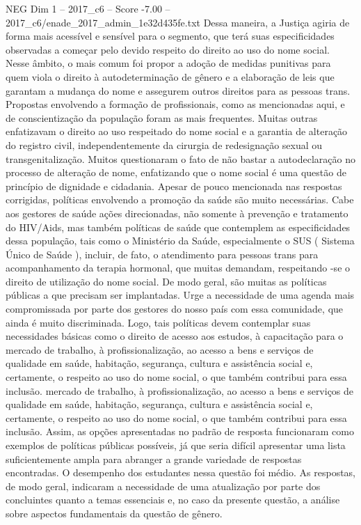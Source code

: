 \begin{textsample}{NEG Dim 1 – 2017\_c6 – Score -7.00 – 2017\_c6/enade\_2017\_admin\_1e32d435fe.txt}
Dessa maneira, a Justiça agiria de forma mais acessível e sensível para o segmento, que terá suas especificidades observadas a começar pelo devido respeito do direito ao uso do nome social.
Nesse âmbito, o mais comum foi propor a adoção de medidas punitivas para quem viola o direito à autodeterminação de gênero e a elaboração de leis que garantam a mudança do nome e assegurem outros direitos para as pessoas trans.
Propostas envolvendo a formação de profissionais, como as mencionadas aqui, e de conscientização da população foram as mais frequentes.
Muitas outras enfatizavam o direito ao uso respeitado do nome social e a garantia de alteração do registro civil, independentemente da cirurgia de redesignação sexual ou transgenitalização.
Muitos questionaram o fato de não bastar a autodeclaração no processo de alteração de nome, enfatizando que o nome social é uma questão de princípio de dignidade e cidadania.
Apesar de pouco mencionada nas respostas corrigidas, políticas envolvendo a promoção da saúde são muito necessárias.
Cabe aos gestores de saúde ações direcionadas, não somente à prevenção e tratamento do HIV/Aids, mas também políticas de saúde que contemplem as especificidades dessa população, tais como o Ministério da Saúde, especialmente o SUS ( Sistema Único de Saúde ), incluir, de fato, o atendimento para pessoas trans para acompanhamento da terapia hormonal, que muitas demandam, respeitando -se o direito de utilização do nome social.
De modo geral, são muitas as políticas públicas a que precisam ser implantadas.
Urge a necessidade de uma agenda mais compromissada por parte dos gestores do nosso país com essa comunidade, que ainda é muito discriminada.
Logo, tais políticas devem contemplar suas necessidades básicas como o direito de acesso aos estudos, à capacitação para o mercado de trabalho, à profissionalização, ao acesso a bens e serviços de qualidade em saúde, habitação, segurança, cultura e assistência social e, certamente, o respeito ao uso do nome social, o que também contribui para essa inclusão. mercado de trabalho, à profissionalização, ao acesso a bens e serviços de qualidade em saúde, habitação, segurança, cultura e assistência social e, certamente, o respeito ao uso do nome social, o que também contribui para essa inclusão.
Assim, as opções apresentadas no padrão de resposta funcionaram como exemplos de políticas públicas possíveis, já que seria difícil apresentar uma lista suficientemente ampla para abranger a grande variedade de respostas encontradas.
O desempenho dos estudantes nessa questão foi médio.
As respostas, de modo geral, indicaram a necessidade de uma atualização por parte dos concluintes quanto a temas essenciais e, no caso da presente questão, a análise sobre aspectos fundamentais da questão de gênero.

\end{textsample}
